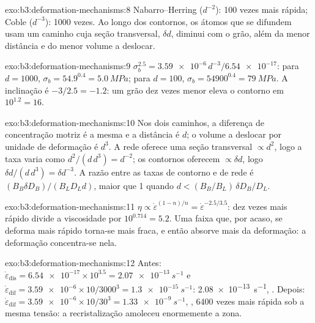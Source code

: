 \begin{solution}{exo:b3:deformation-mechanisms:8}
Nabarro--Herring ($d^{-2}$): 100 vezes mais rápida; Coble ($d^{-3}$): 1000 vezes.
Ao longo dos contornos, os átomos que se difundem usam um caminho cuja seção transversal, $\delta
d$, diminui com o grão, além da menor distância e do menor
volume a deslocar.
\end{solution}

\begin{solution}{exo:b3:deformation-mechanisms:9}
$\sigma_b^{2.5} = \num{3.59e-6}\,d^{-3}/\num{6.54e-17}$: para $d = 1000$,
$\sigma_b = 54.9^{0.4} = \qty{5.0}{MPa}$; para $d = 100$, $\sigma_b =
\num{54900}^{0.4} = \qty{79}{MPa}$. A inclinação é $-3/2.5 = -1.2$: um grão
dez vezes menor eleva o contorno em $10^{1.2} = 16$.
\end{solution}

\begin{solution}{exo:b3:deformation-mechanisms:10}
Nos dois caminhos, a diferença de concentração motriz é a mesma e a
distância é $d$; o volume a deslocar por unidade de deformação é $d^3$. A rede
oferece uma seção transversal $\propto d^2$, logo a taxa varia como $d^2/(d\,d^3) =
d^{-2}$; os contornos oferecem $\propto\delta d$, logo $\delta d/(d\,d^3) = \delta
d^{-3}$. A razão entre as taxas de contorno e de rede é $(B_B\delta D_B)/(B_LD_Ld)$,
maior que 1 quando $d < (B_B/B_L)\,\delta D_B/D_L$.
\end{solution}

\begin{solution}{exo:b3:deformation-mechanisms:11}
$\eta \propto \dot\varepsilon^{(1-n)/n} = \dot\varepsilon^{-2.5/3.5}$: dez vezes
mais rápido divide a viscosidade por $10^{0.714} = 5.2$. Uma faixa que, por acaso,
se deforma mais rápido torna-se mais fraca, e então absorve mais da deformação:
a deformação concentra-se nela.
\end{solution}

\begin{solution}{exo:b3:deformation-mechanisms:12}
Antes: $\dot\varepsilon_{\mathrm{dis}} = \num{6.54e-17}\times10^{3.5} =
\qty{2.07e-13}{s^{-1}}$ e $\dot\varepsilon_{\mathrm{dif}} = \num{3.59e-6}
\times10/3000^3 = \qty{1.3e-15}{s^{-1}}$: \qty{2.08e-13}{s^{-1}}, . Depois: $\dot\varepsilon_{\mathrm{dif}} = \num{3.59e-6}\times10/30^3 =
\qty{1.33e-9}{s^{-1}}$, , \num{6400} vezes mais rápida sob a
mesma tensão: a recristalização amoleceu enormemente a zona.
\end{solution}

